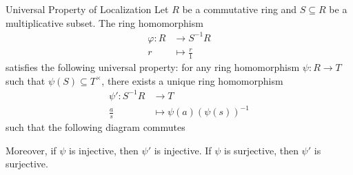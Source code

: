 \begin{proposition}{Universal Property of Localization}{}
    Let $R$ be a commutative ring and $S\subseteq R$ be a multiplicative subset. The ring homomorphism
    \begin{align*}
        \varphi:R&\longrightarrow S^{-1}R\\
         r&\longmapsto \frac{r}{1}
    \end{align*}
    satisfies the following universal property: for any ring homomorphism $\psi:R\to T$ such that $\psi(S)\subseteq T^\times$, there exists a unique ring homomorphism 
    \begin{align*}
        \psi':S^{-1}R&\longrightarrow T\\
        \frac{a}{s}&\longmapsto \psi(a)(\psi(s))^{-1}
    \end{align*}
    such that the following diagram commutes
    \begin{center}
    \end{center}
    Moreover, if $\psi$ is injective, then $\psi'$ is injective. If $\psi$ is surjective, then $\psi'$ is surjective.
\end{proposition}

